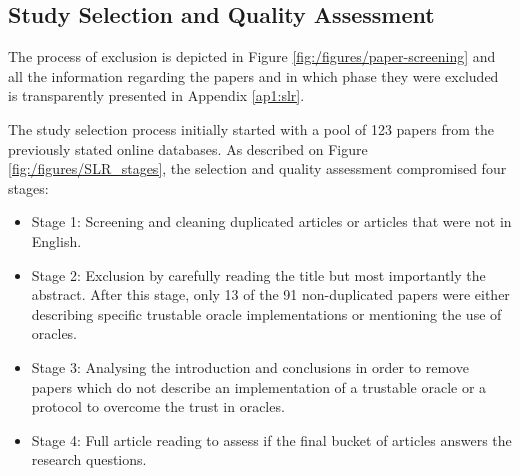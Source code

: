 \subsection{Study Selection and Quality Assessment}

The process of exclusion is depicted in Figure \ref{fig:/figures/paper-screening} and all the information regarding the papers and in which phase they were excluded is transparently presented in Appendix \ref{ap1:slr}.

The study selection process initially started with a pool of 123 papers from the previously stated online databases. As described on Figure \ref{fig:/figures/SLR_stages}, the selection and quality assessment compromised four stages:
\begin{itemize}
  \item Stage 1: Screening and cleaning duplicated articles or articles that were not in English.
  \item Stage 2: Exclusion by carefully reading the title but most importantly the abstract. After this stage, only 13 of the 91 non-duplicated papers were either describing specific trustable oracle implementations or mentioning the use of oracles.
  \item Stage 3: Analysing the introduction and conclusions in order to remove papers which do not describe an implementation of a trustable oracle or a protocol to overcome the trust in oracles.
  \item Stage 4: Full article reading to assess if the final bucket of articles answers the research questions.
\end{itemize}



